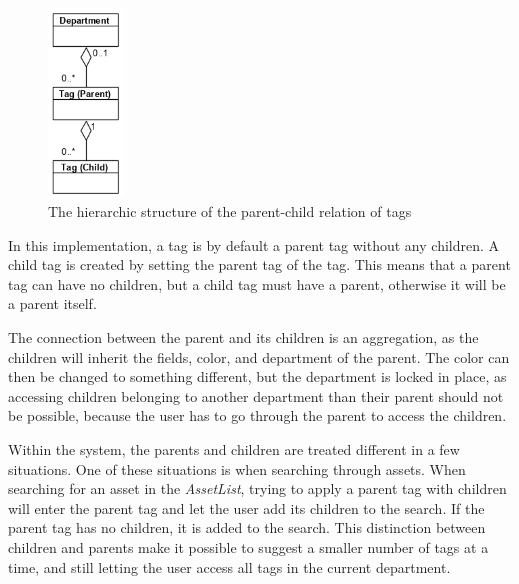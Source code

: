 \begin{figure}[H]
    \centering
    \includegraphics[width=0.18\textwidth]{figures/Implementation/TagHierarchicStructure.png}
    \caption{The hierarchic structure of the parent-child relation of tags}
    \label{fig:TagHierarchicStructureWithDepartment}
\end{figure}

In this implementation, a tag is by default a parent tag without any children. A child tag is created by setting the parent tag of the tag. This means that a parent tag can have no children, but a child tag must have a parent, otherwise it will be a parent itself.
\par
The connection between the parent and its children is an aggregation, as the children will inherit the fields, color, and department of the parent. The color can then be changed to something different, but the department is locked in place, as accessing children belonging to another department than their parent should not be possible, because the user has to go through the parent to access the children.
\par
Within the system, the parents and children are treated different in a few situations. One of these situations is when searching through assets. When searching for an asset in the \textit{AssetList}, trying to apply a parent tag with children will enter the parent tag and let the user add its children to the search. If the parent tag has no children, it is added to the search. This distinction between children and parents make it possible to suggest a smaller number of tags at a time, and still letting the user access all tags in the current department.

